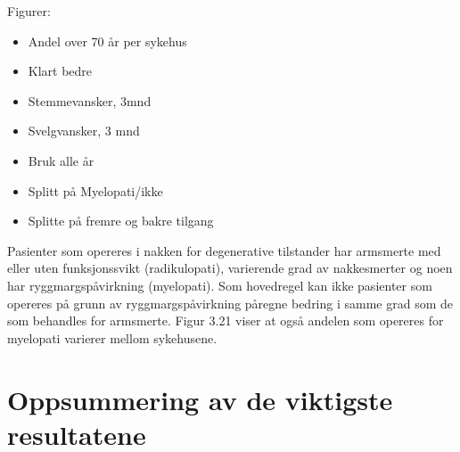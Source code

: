 \documentclass [norsk,a4paper,twoside]{article}\usepackage[]{graphicx}\usepackage[]{color}
\begin{document}
Figurer:
\begin{itemize}
\item Andel over 70 år per sykehus
\item Klart bedre
\item Stemmevansker, 3mnd
\item Svelgvansker, 3 mnd
\item Bruk alle år
\item Splitt på Myelopati/ikke
\item Splitte på fremre og bakre tilgang
\end{itemize}



Pasienter som opereres i nakken for degenerative tilstander har armsmerte med
eller uten funksjonssvikt (radikulopati), varierende grad av nakkesmerter og noen
har ryggmargspåvirkning (myelopati). Som hovedregel kan ikke pasienter som
opereres på grunn av ryggmargspåvirkning påregne bedring i samme grad som de
som behandles for armsmerte. Figur 3.21 viser at også andelen som opereres for
myelopati varierer mellom sykehusene.



\section{Oppsummering av de viktigste resultatene}
\end{document}
